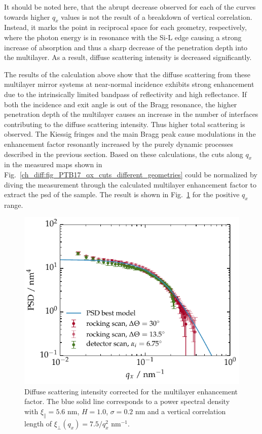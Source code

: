 It should be noted here, that the abrupt decrease observed for each of the curves towards higher $q_x$ values is not the result of a breakdown of vertical correlation. Instead, it marks the point in reciprocal space for each geometry, respectively, where the photon energy is in resonance with the Si-L edge causing a strong increase of absorption and thus a sharp decrease of the penetration depth into the multilayer. As a result, diffuse scattering intensity is decreased significantly.

The results of the calculation above show that the diffuse scattering from these multilayer mirror systems at near-normal incidence exhibits strong enhancement due to the intrinsically limited bandpass of reflectivity and high reflectance. If both the incidence and exit angle is out of the Bragg resonance, the higher penetration depth of the multilayer causes an increase in the number of interfaces contributing to the diffuse scattering intensity. Thus higher total scattering is observed. The Kiessig fringes and the main Bragg peak cause modulations in the enhancement factor resonantly increased by the purely dynamic processes described in the previous section. Based on these calculations, the cuts along $q_x$ in the measured maps shown in Fig.~\ref{ch_diff:fig_PTB17_qx_cuts_different_geometries} could be normalized by diving the measurement through the calculated multilayer enhancement factor to extract the \gls{psd} of the sample. The result is shown in Fig.~\ref{ch_diff:PTB17_PSD_for_all_geometries} for the positive $q_x$ range.
\begin{figure}[htbp]
	\includegraphics{img/PTB17_PSD_for_all_geometries} \caption{Diffuse scattering intensity corrected for the multilayer enhancement factor. The blue solid line corresponds to a power spectral density with $\xi_\parallel=5.6$ nm, $H=1.0$, $\sigma=0.2$ nm and a vertical correlation length of $\xi_\perp(q_x)=7.5/q_x^2$ nm$^{-1}$.} \label{ch_diff:PTB17_PSD_for_all_geometries} 
\end{figure}
